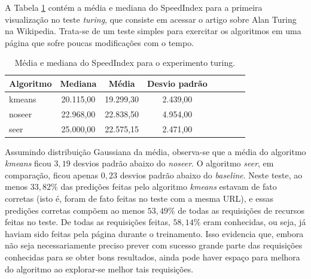 \documentclass[10pt,twocolumn,letterpaper]{article}
\begin{document}
A Tabela \ref{tbl-turing} contém a média e mediana do SpeedIndex para a primeira visualização no teste \emph{turing}, que consiste em acessar o artigo sobre Alan Turing na Wikipedia. Trata-se de um teste simples para exercitar os algoritmos em uma página que sofre poucas modificações com o tempo.

\begin{table}
\begin{center}
\begin{tabular}{l*{6}{c}r}
\hline
Algoritmo & Mediana & Média & Desvio padrão \\
\hline
kmeans & 20.115,00 & 19.299,30  & 2.439,00 \\
noseer & 22.968,00 & 22.838,50 & 4.954,00 \\
seer & 25.000,00 & 22.575,15 & 2.471,00 \\
\hline
\end{tabular}
\end{center}
\caption{Média e mediana do SpeedIndex para o experimento turing.}
\label{tbl-turing}
\end{table}

Assumindo distribuição Gaussiana da média, observa-se que a média do algoritmo \emph{kmeans} ficou $3,19$ desvios padrão abaixo do \emph{noseer}. O algoritmo \emph{seer}, em comparação, ficou apenas $0,23$ desvios padrão abaixo do \emph{baseline}. Neste teste, ao menos $33,82 \%$ das predições feitas pelo algoritmo \emph{kmeans} estavam de fato corretas (isto é, foram de fato feitas no teste com a mesma URL), e essas predições corretas compõem ao menos $53,49 \%$ de todas as requisições de recursos feitas no teste. De todas as requisições feitas, $58,14 \%$ eram conhecidas, ou seja, já haviam sido feitas pela página durante o treinamento. Isso evidencia que, embora não seja necessariamente preciso prever com sucesso grande parte das requisições conhecidas para se obter bons resultados, ainda pode haver espaço para melhora do algoritmo ao explorar-se melhor tais requisições.
\end{document}
